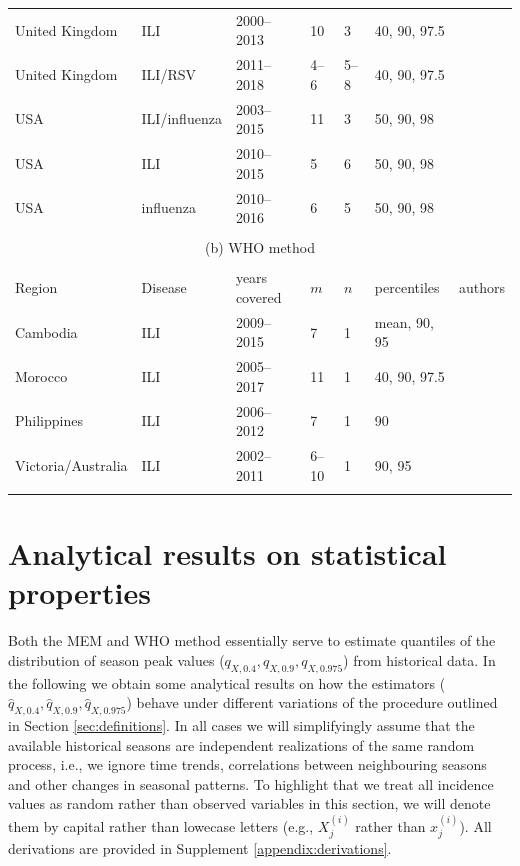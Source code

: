 \documentclass{article}
\begin{document}
\begin{table}[h!]
\begin{tabular}{l l l l l l l}
United Kingdom & ILI & 2000--2013 & 10 & 3 & 40, 90, 97.5 & \cite{Green2015}\\
United Kingdom & ILI/RSV & 2011--2018 & 4--6 & 5--8 & 40, 90, 97.5 & \cite{Harcourt2019}\\
USA & ILI/influenza & 2003--2015 & 11 & 3 & 50, 90, 98 & \cite{Biggerstaff2017}\\
USA & ILI & 2010--2015 & 5 & 6 & 50, 90, 98 & \cite{Dahlgren2018}\\
USA & influenza & 2010--2016 & 6 & 5 & 50, 90, 98 & \cite{Dahlgren2019}\\
\bottomrule\\
\multicolumn{7}{c}{(b) WHO method}\\ \\
\toprule
Region & Disease & years covered & $m$ & $n$ & percentiles & authors\\
\midrule
Cambodia & ILI & 2009--2015 & 7 & 1 & mean, 90, 95 & \cite{Ly2017}\\
Morocco & ILI & 2005--2017 & 11 & 1 & 40, 90, 97.5 & \cite{Rguig2020}\\
Philippines & ILI & 2006--2012 & 7 & 1 & 90 & \cite{Lucero2016}\\
Victoria/Australia & ILI & 2002--2011 & 6--10 & 1 & 90, 95 & \cite{Tay2013}\\
\bottomrule\\
\end{tabular}
\end{table}



\section{Analytical results on statistical properties}
\label{sec:analytical_results}

Both the MEM and WHO method essentially serve to estimate quantiles of the distribution of season peak values ($q_{X, 0.4}, q_{X, 0.9}, q_{X, 0.975}$) from historical data. In the following we obtain some analytical results on how the estimators ($\hat{q}_{X, 0.4}, \hat{q}_{X, 0.9}, \hat{q}_{X, 0.975}$) behave under different variations of the procedure outlined in Section \ref{sec:definitions}. In all cases we will simplifyingly assume that the available historical seasons are independent realizations of the same random process, i.e., we ignore time trends, correlations between neighbouring seasons and other changes in seasonal patterns. To highlight that we treat all incidence values as random rather than observed variables in this section, we will denote them by capital rather than lowecase letters (e.g., $X_j^{(i)}$ rather than $x_j^{(i)}$). All derivations are provided in Supplement \ref{appendix:derivations}.
\end{document}
